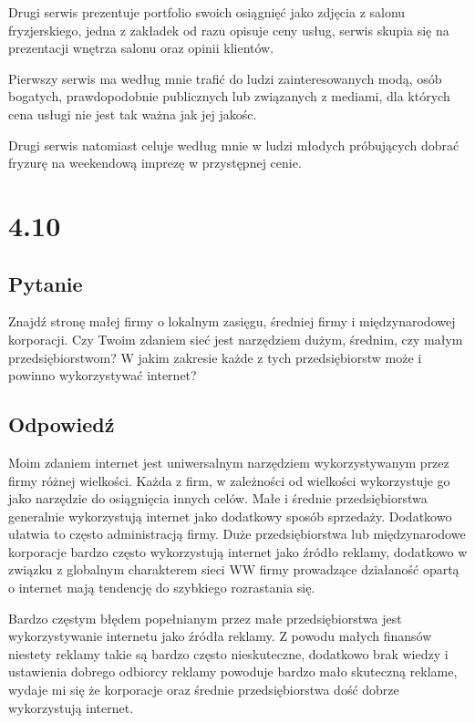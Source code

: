 \documentclass[paper=a4, fontsize=11pt]{scrartcl} %
\numberwithin{equation}{section} %
\numberwithin{figure}{section} %
\numberwithin{table}{section} %
\begin{document}
Drugi serwis prezentuje portfolio swoich osiągnięć jako zdjęcia z salonu fryzjerskiego, jedna z zakładek od razu
opisuje ceny usług, serwis skupia się na prezentacji wnętrza salonu oraz opinii klientów.

Pierwszy serwis ma według mnie trafić do ludzi zainteresowanych modą, osób bogatych, prawdopodobnie publicznych
lub związanych z mediami, dla których cena usługi nie jest tak ważna jak jej jakośc.

Drugi serwis natomiast celuje według mnie w ludzi młodych próbujących dobrać fryzurę na weekendową imprezę w 
przystępnej cenie.

\section {4.10}

\subsection {Pytanie}

Znajdź stronę małej firmy o lokalnym zasięgu, średniej firmy i międzynarodowej korporacji. Czy Twoim zdaniem
sieć jest narzędziem dużym, średnim, czy małym przedsiębiorstwom? W jakim zakresie każde z tych przedsiębiorstw
może i powinno wykorzystywać internet?

\subsection {Odpowiedź}

Moim zdaniem internet jest uniwersalnym narzędziem wykorzystywanym przez firmy różnej wielkości.
Każda z firm, w zależności od wielkości wykorzystuje go jako narzędzie do osiągnięcia innych celów.
Małe i średnie przedsiębiorstwa generalnie wykorzystują internet jako dodatkowy sposób sprzedaży.
Dodatkowo ułatwia to często administracją firmy. Duże przedsiębiorstwa lub międzynarodowe korporacje
bardzo często wykorzystują internet jako źródło reklamy, dodatkowo w związku z globalnym charakterem
sieci WW firmy prowadzące działaność opartą o internet mają tendencję do szybkiego rozrastania się.

Bardzo częstym błędem popełnianym przez małe przedsiębiorstwa jest wykorzystywanie internetu jako źródła
reklamy. Z powodu małych finansów niestety reklamy takie są bardzo często nieskuteczne, dodatkowo
brak wiedzy i ustawienia dobrego odbiorcy reklamy powoduje bardzo mało skuteczną reklame, wydaje mi się
że korporacje oraz średnie przedsiębiorstwa dość dobrze wykorzystują internet.
\end{document}
